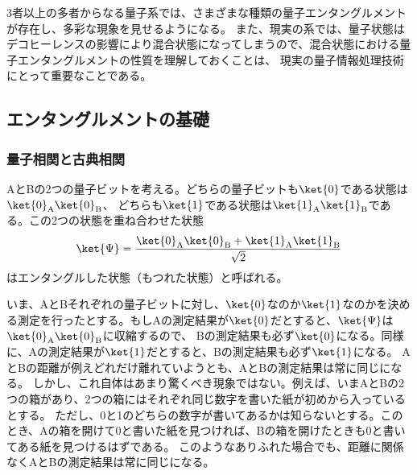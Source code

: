 \documentclass[a4paper,11pt,uplatex]{jsarticle}%
\begin{document}
3者以上の多者からなる量子系では、さまざまな種類の量子エンタングルメントが存在し、多彩な現象を見せるようになる。
また、現実の系では、量子状態はデコヒーレンスの影響により混合状態になってしまうので、混合状態における量子エンタングルメントの性質を理解しておくことは、
現実の量子情報処理技術にとって重要なことである。

\subsection{エンタングルメントの基礎}
\subsubsection{量子相関と古典相関}
AとBの2つの量子ビットを考える。どちらの量子ビットも$\ket{0}$である状態は$\ket{0}_{\text{A}}\ket{0}_{\text{B}}$、
どちらも$\ket{1}$である状態は$\ket{1}_{\text{A}}\ket{1}_{\text{B}}$である。この2つの状態を重ね合わせた状態
\begin{equation}
  \ket{\Psi} = \frac{\ket{0}_{\text{A}}\ket{0}_{\text{B}} + \ket{1}_{\text{A}}\ket{1}_{\text{B}}}{\sqrt{2}}
\end{equation}
はエンタングルした状態（もつれた状態）と呼ばれる。

いま、AとBそれぞれの量子ビットに対し、$\ket{0}$なのか$\ket{1}$なのかを決める測定を行ったとする。もしAの測定結果が$\ket{0}$だとすると、$\ket{\Psi}$は$\ket{0}_{\text{A}}\ket{0}_{\text{B}}$に収縮するので、
Bの測定結果も必ず$\ket{0}$になる。同様に、Aの測定結果が$\ket{1}$だとすると、Bの測定結果も必ず$\ket{1}$になる。
AとBの距離が例えどれだけ離れていようとも、AとBの測定結果は常に同じになる。
しかし、これ自体はあまり驚くべき現象ではない。例えば、いまAとBの2つの箱があり、2つの箱にはそれぞれ同じ数字を書いた紙が初めから入っているとする。
ただし、0と1のどちらの数字が書いてあるかは知らないとする。このとき、Aの箱を開けて0と書いた紙を見つければ、Bの箱を開けたときも0と書いてある紙を見つけるはずである。
このようなありふれた場合でも、距離に関係なくAとBの測定結果は常に同じになる。
\end{document}

